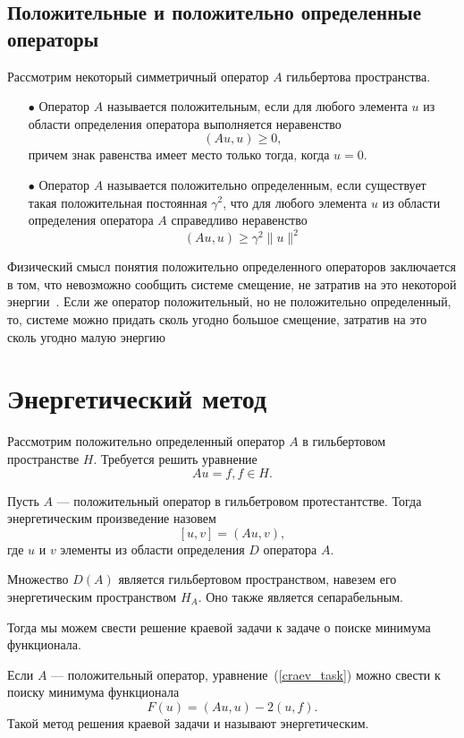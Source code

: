 \documentclass[12pt, a4paper]{article}
\begin{document}
\subsection{Положительные и положительно определенные операторы}
Рассмотрим некоторый симметричный оператор $A$ гильбертова пространства.
\begin{itemize}
	\item [$\bullet$]
Оператор $A$ называется положительным,
если для любого элемента $u$ из области определения оператора
выполняется неравенство
\[
(Au, u) \geqslant 0,
\]
причем знак равенства имеет место только тогда, когда $u = 0$.
\item [$\bullet$]
Оператор $A$ называется положительно определенным, если существует такая положительная постоянная $\gamma^2$, что для любого элемента $u$ из области определения оператора $A$ справедливо неравенство
\[\label{positive_definite_operator_1}
	(Au, u) \geqslant \gamma^2 \|u\|^2
\]
\end{itemize}

Физический смысл понятия положительно определенного
операторов заключается в том, что невозможно сообщить
системе смещение, не затратив на это некоторой энергии~\cite{MICHLIN_SMOLICKY}. Если же оператор положительный, но не положительно
определенный, то, системе можно придать сколь угодно большое смещение, затратив на это сколь угодно малую энергию

\section{Энергетический метод}
Рассмотрим положительно определенный оператор $A$ в гильбертовом пространстве $H$. Требуется решить уравнение 
\begin{equation}
	\label{craev_task}
	Au = f, f \in H. 
\end{equation}

Пусть $A$ --- положительный оператор в гильбетровом протестантстве. Тогда энергетическим произведение назовем 
\[
	[u, v] = (Au, v),
\]
\noindent где $u$ и $v$ элементы из области определения $D$ оператора $A$. 

Множество $D(A)$ является гильбертовом пространством, навезем его энергетическим пространством $H_A$. Оно также является сепарабельным.

Тогда мы можем свести решение краевой задачи к задаче о поиске минимума функционала.

Если $A$ --- положительный оператор, уравнение~(\ref{craev_task}) можно свести к поиску минимума функционала
\begin{equation}
	\label{craev-min_task}
	F(u) = (Au, u) - 2(u, f).
\end{equation}
Такой метод решения краевой задачи и называют энергетическим.
\end{document}
